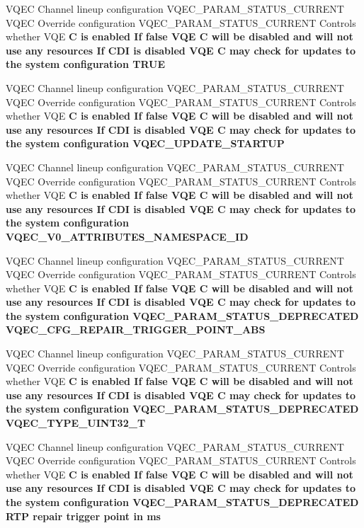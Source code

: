 \begin{CompactItemize}
\item 
VQEC Channel lineup configuration VQEC\_\-PARAM\_\-STATUS\_\-CURRENT VQEC Override configuration VQEC\_\-PARAM\_\-STATUS\_\-CURRENT Controls whether VQE \bf{C} is enabled If false VQE \bf{C} will be disabled and will not use any resources If CDI is disabled VQE \bf{C} may check for updates \bf{to} the system configuration \bf{TRUE}
\item 
VQEC Channel lineup configuration VQEC\_\-PARAM\_\-STATUS\_\-CURRENT VQEC Override configuration VQEC\_\-PARAM\_\-STATUS\_\-CURRENT Controls whether VQE \bf{C} is enabled If false VQE \bf{C} will be disabled and will not use any resources If CDI is disabled VQE \bf{C} may check for updates \bf{to} the system configuration \bf{VQEC\_\-UPDATE\_\-STARTUP}
\item 
VQEC Channel lineup configuration VQEC\_\-PARAM\_\-STATUS\_\-CURRENT VQEC Override configuration VQEC\_\-PARAM\_\-STATUS\_\-CURRENT Controls whether VQE \bf{C} is enabled If false VQE \bf{C} will be disabled and will not use any resources If CDI is disabled VQE \bf{C} may check for updates \bf{to} the system configuration \bf{VQEC\_\-V0\_\-ATTRIBUTES\_\-NAMESPACE\_\-ID}
\item 
VQEC Channel lineup configuration VQEC\_\-PARAM\_\-STATUS\_\-CURRENT VQEC Override configuration VQEC\_\-PARAM\_\-STATUS\_\-CURRENT Controls whether VQE \bf{C} is enabled If false VQE \bf{C} will be disabled and will not use any resources If CDI is disabled VQE \bf{C} may check for updates \bf{to} the system configuration VQEC\_\-PARAM\_\-STATUS\_\-DEPRECATED \bf{VQEC\_\-CFG\_\-REPAIR\_\-TRIGGER\_\-POINT\_\-ABS}
\item 
VQEC Channel lineup configuration VQEC\_\-PARAM\_\-STATUS\_\-CURRENT VQEC Override configuration VQEC\_\-PARAM\_\-STATUS\_\-CURRENT Controls whether VQE \bf{C} is enabled If false VQE \bf{C} will be disabled and will not use any resources If CDI is disabled VQE \bf{C} may check for updates \bf{to} the system configuration VQEC\_\-PARAM\_\-STATUS\_\-DEPRECATED \bf{VQEC\_\-TYPE\_\-UINT32\_\-T}
\item 
VQEC Channel lineup configuration VQEC\_\-PARAM\_\-STATUS\_\-CURRENT VQEC Override configuration VQEC\_\-PARAM\_\-STATUS\_\-CURRENT Controls whether VQE \bf{C} is enabled If false VQE \bf{C} will be disabled and will not use any resources If CDI is disabled VQE \bf{C} may check for updates \bf{to} the system configuration VQEC\_\-PARAM\_\-STATUS\_\-DEPRECATED RTP repair trigger point in \bf{ms}
\item 

\end{CompactItemize}

